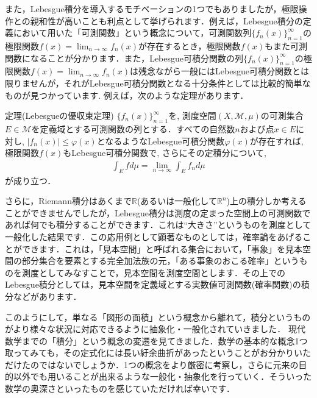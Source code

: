 \par また，Lebesgue積分を導入するモチベーションの1つでもありましたが，極限操作との親和性が高いことも利点として挙げられます．例えば，Lebesgue積分の定義において用いた「可測関数」という概念について，可測関数列$\{f_n(x)\}_{n=1}^{\infty}$の極限関数$f(x)=\displaystyle\lim _{n \to \infty}f_{n}(x)$が存在するとき，極限関数$f(x)$もまた可測関数になることが分かります．また，Lebesgue可積分関数の列$\{f_n(x)\}_{n=1}^{\infty}$の極限関数$f(x)=\displaystyle\lim _{n \to \infty}f_{n}(x)$は残念ながら一般にはLebesgue可積分関数とは限りませんが，それがLebesgue可積分関数となる十分条件としては比較的簡単なものが見つかっています. 例えば，次のような定理があります． 
\begin{itembox}[l]{定理(Lebesgueの優収束定理)}
$\{f_n(x)\}_{n=1}^{\infty}$を, 測度空間$(X,\mathcal{M},\mu)$の可測集合$E\in \mathcal{M}$を定義域とする可測関数の列とする．すべての自然数$n$および点$x\in E$に対し, $\left| f_{n}(x)\right| \le \varphi(x)$となるようなLebesgue可積分関数$\varphi(x)$が存在すれば, 極限関数$f(x)$もLebesgue可積分関数で, さらにその定積分について, 
\begin{eqnarray}
\int_{E}fd\mu=\lim_{n \to \infty} \int_{E}f_{n}d\mu \nonumber
\end{eqnarray}
が成り立つ．
\end{itembox}
\par さらに，Riemann積分はあくまで$\mathbb{R}$(あるいは一般化して$\mathbb{R}^n$)上の積分しか考えることができませんでしたが，Lebesgue積分は測度の定まった空間上の可測関数であれば何でも積分することができます．これは“大きさ”というものを測度として一般化した結果です．この応用例として顕著なものとしては，確率論をあげることができます．これは，「見本空間」と呼ばれる集合において，「事象」を見本空間の部分集合を要素とする完全加法族の元，「ある事象のおこる確率」というものを測度としてみなすことで，見本空間を測度空間とします．その上でのLebesgue積分としては，見本空間を定義域とする実数値可測関数(確率関数)の積分などがあります．
\par このようにして，単なる「図形の面積」という概念から離れて，積分というものがより様々な状況に対応できるように抽象化・一般化されていきました．
現代数学までの「積分」という概念の変遷を見てきました．数学の基本的な概念1つ取ってみても，その定式化には長い紆余曲折があったということがお分かりいただけたのではないでしょうか．1つの概念をより厳密に考察し，さらに元来の目的以外でも用いることが出来るような一般化・抽象化を行っていく．そういった数学の奥深さといったものを感じていただければ幸いです．

